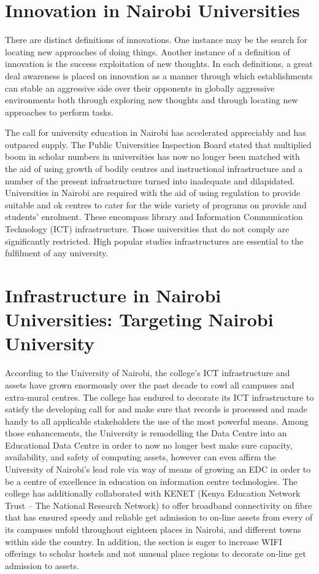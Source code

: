 \section{\textbf{Innovation in Nairobi Universities}}
There are distinct definitions of innovations. One instance may be the search for locating new approaches of doing things. Another instance of a definition of innovation is the success exploitation of new thoughts. In each definitions, a great deal awareness is placed on innovation as a manner through which establishments can stable an aggressive side over their opponents in globally aggressive environments both through exploring new thoughts and through locating new approaches to perform tasks.

The call for university education in Nairobi has accelerated appreciably and has outpaced supply. The Public Universities Inspection Board stated that multiplied boom in scholar numbers in universities has now no longer been matched with the aid of using growth of bodily centres and instructional infrastructure and a number of the present infrastructure turned into inadequate and dilapidated. Universities in Nairobi are required with the aid of using regulation to provide suitable and ok centres to cater for the wide variety of programs on provide and students’ enrolment. These encompass library and Information Communication Technology (ICT) infrastructure. Those universities that do not comply are significantly restricted.  High popular studies infrastructures are essential to the fulfilment of any university.

\section{\textbf{Infrastructure in Nairobi Universities: Targeting Nairobi University}}
According to the University of Nairobi, the college’s ICT infrastructure and assets have grown enormously over the past decade to cowl all campuses and extra-mural centres. The college has endured to decorate its ICT infrastructure to satisfy the developing call for and make sure that records is processed and made handy to all applicable stakeholders the use of the most powerful means. Among those enhancements, the University is remodelling the Data Centre into an Educational Data Centre in order to now no longer best make sure capacity, availability, and safety of computing assets, however can even affirm the University of Nairobi’s lead role via way of means of growing an EDC in order to be a centre of excellence in education on information centre technologies. The college has additionally collaborated with KENET (Kenya Education Network Trust – The National Research Network) to offer broadband connectivity on fibre that has ensured speedy and reliable get admission to on-line assets from every of its campuses unfold throughout eighteen places in Nairobi, and different towns within side the country. In addition, the section is eager to increase WIFI offerings to scholar hostels and not unusual place regions to decorate on-line get admission to assets.

